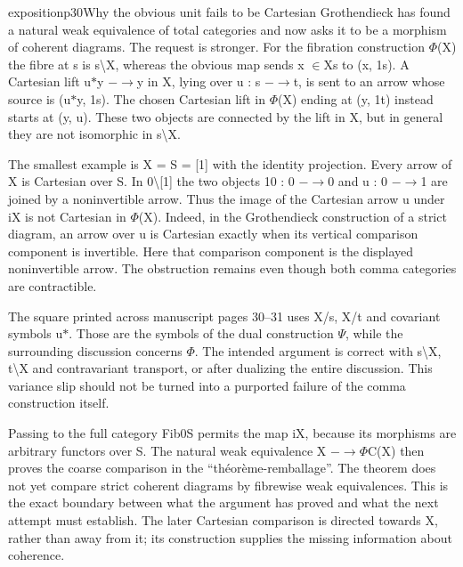 \begin{dcomment}{exposition}{p30}{Why the obvious unit fails to be Cartesian}
Grothendieck has found a natural weak equivalence of total categories and now asks it to be a morphism of coherent diagrams. The request is stronger. For the fibration construction \ensuremath{\Phi}(X) the fibre at s is s\textbackslash{}X, whereas the obvious map sends x \ensuremath{\in}Xs to (x, 1s). A Cartesian lift u\ensuremath{*}y \ensuremath{-}\ensuremath{\to}y in X, lying over u : s \ensuremath{-}\ensuremath{\to}t, is sent to an arrow whose source is (u\ensuremath{*}y, 1s). The chosen Cartesian lift in \ensuremath{\Phi}(X) ending at (y, 1t) instead starts at (y, u). These two objects are connected by the lift in X, but in general they are not isomorphic in s\textbackslash{}X.

The smallest example is X = S = [1] with the identity projection. Every arrow of X is Cartesian over S. In 0\textbackslash{}[1] the two objects 10 : 0 \ensuremath{-}\ensuremath{\to}0 and u : 0 \ensuremath{-}\ensuremath{\to}1 are joined by a noninvertible arrow. Thus the image of the Cartesian arrow u under iX is not Cartesian in \ensuremath{\Phi}(X). Indeed, in the Grothendieck construction of a strict diagram, an arrow over u is Cartesian exactly when its vertical comparison component is invertible. Here that comparison component is the displayed noninvertible arrow. The obstruction remains even though both comma categories are contractible.

The square printed across manuscript pages 30--31 uses X/s, X/t and covariant symbols u\ensuremath{*}. Those are the symbols of the dual construction \ensuremath{\Psi}, while the surrounding discussion concerns \ensuremath{\Phi}. The intended argument is correct with s\textbackslash{}X, t\textbackslash{}X and contravariant transport, or after dualizing the entire discussion. This variance slip should not be turned into a purported failure of the comma construction itself.

Passing to the full category Fib0S permits the map iX, because its morphisms are arbitrary functors over S. The natural weak equivalence X \ensuremath{-}\ensuremath{\to}\ensuremath{\Phi}C(X) then proves the coarse comparison in the “théorème-remballage”. The theorem does not yet compare strict coherent diagrams by fibrewise weak equivalences. This is the exact boundary between what the argument has proved and what the next attempt must establish. The later Cartesian comparison is directed towards X, rather than away from it; its construction supplies the missing information about coherence.

\end{dcomment}


